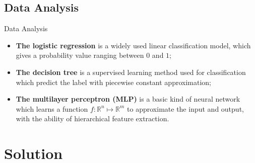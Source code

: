 \documentclass{beamer}
\begin{document}
\subsection{Data Analysis}

\begin{frame}{Data Analysis}

  \begin{itemize}
    \item \textbf{The logistic regression}   is a widely used linear classification model, which gives a probability value ranging between $0$ and $1$; \vspace{.25cm}
    \item \textbf{The decision tree}   is a supervised learning method used for classification which predict the label with piecewise constant approximation; \vspace{.25cm}
    \item \textbf{The multilayer perceptron (MLP)}   is a basic kind of neural network which learns a function $f: \mathbb{R}^n \mapsto \mathbb{R}^m$ to approximate the input and output, with the ability of hierarchical feature extraction.
  \end{itemize}

\end{frame}

\section{Solution}
\end{document}
